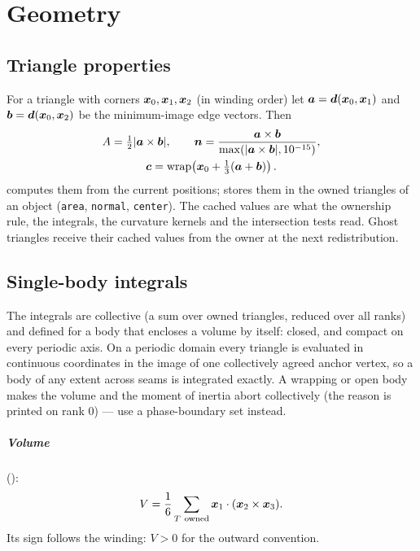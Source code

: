 \chapter{Geometry}
\label{ch:geometry}

\section{Triangle properties}
\label{sec:triprops}

For a triangle with corners $\boldsymbol{x}_0,\boldsymbol{x}_1,\boldsymbol{x}_2$ (in winding order) let
$\boldsymbol{a}=\boldsymbol{d}(\boldsymbol{x}_0,\boldsymbol{x}_1)$ and $\boldsymbol{b}=\boldsymbol{d}(\boldsymbol{x}_0,\boldsymbol{x}_2)$ be the
minimum-image edge vectors. Then
\begin{gather}
  A = \tfrac12\lvert\boldsymbol{a}\times\boldsymbol{b}\rvert,\qquad
  \boldsymbol{n} = \frac{\boldsymbol{a}\times\boldsymbol{b}}{\max(\lvert\boldsymbol{a}\times\boldsymbol{b}\rvert,10^{-15})},\\
  \boldsymbol{c} = \operatorname{wrap}\!\left(\boldsymbol{x}_0 + \tfrac13(\boldsymbol{a}+\boldsymbol{b})\right).
\end{gather}
 computes them from the current positions;
 stores them in the owned triangles of an object
(\texttt{area}, \texttt{normal}, \texttt{center}). The cached values are what the ownership rule,
the integrals, the curvature kernels and the intersection tests read. Ghost triangles receive
their cached values from the owner at the next redistribution.

\section{Single-body integrals}

The integrals are collective (a sum over owned triangles, reduced over all ranks) and defined
for a body that encloses a volume by itself: closed, and compact on every periodic axis. On a
periodic domain every triangle is evaluated in continuous coordinates in the image of one
collectively agreed anchor vertex, so a body of any extent across seams is integrated exactly. A
wrapping or open body makes the volume and the moment of inertia abort collectively (the reason is
printed on rank 0) --- use a phase-boundary set instead.

\paragraph{Volume} ():
\begin{equation}
  V = \frac16\sum_{T\ \text{owned}} \boldsymbol{x}_1\cdot(\boldsymbol{x}_2\times\boldsymbol{x}_3).
\end{equation}
Its sign follows the winding: $V>0$ for the outward convention.

